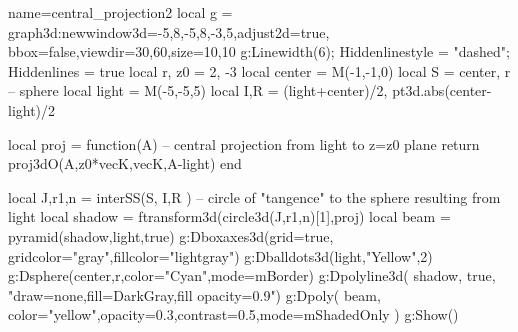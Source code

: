 \documentclass[border=5pt]{standalone}%
\begin{document}
%
\begin{luadraw}{name=central_projection2}
local g = graph3d:new{window3d={-5,8,-5,8,-3,5},adjust2d=true, bbox=false,viewdir={30,60},size={10,10}}
g:Linewidth(6); Hiddenlinestyle = "dashed"; Hiddenlines = true
local r, z0 = 2, -3
local center = M(-1,-1,0)
local S = {center, r} -- sphere
local light = M(-5,-5,5)
local I,R = (light+center)/2, pt3d.abs(center-light)/2

local proj = function(A) -- central projection from light to z=z0 plane
    return proj3dO(A,{z0*vecK,vecK},A-light)
end

local J,r1,n = interSS(S, {I,R} ) -- circle of "tangence" to the sphere resulting from light
local shadow = ftransform3d(circle3d(J,r1,n)[1],proj)
local beam = pyramid(shadow,light,true)
g:Dboxaxes3d({grid=true, gridcolor="gray",fillcolor="lightgray"})
g:Dballdots3d(light,"Yellow",2)
g:Dsphere(center,r,{color="Cyan",mode=mBorder})
g:Dpolyline3d( shadow, true, "draw=none,fill=DarkGray,fill opacity=0.9") 
g:Dpoly( beam, {color="yellow",opacity=0.3,contrast=0.5,mode=mShadedOnly} )
g:Show()
\end{luadraw}
\end{document}
